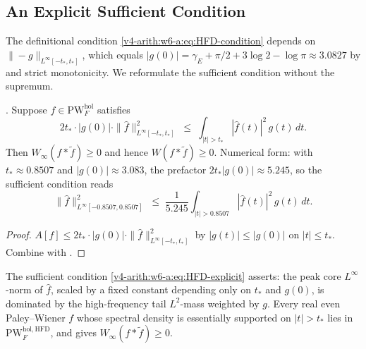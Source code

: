 \subsection{An Explicit Sufficient Condition}
\label{v4-arith:w6-a:HFD-subclass:explicit}

The definitional condition \eqref{v4-arith:w6-a:eq:HFD-condition}
depends on \(\|{-}g\|_{L^{\infty}[-t_{\ast},t_{\ast}]}\), which equals
\(|g(0)|=\gamma_{E}+\pi/2+3\log 2-\log\pi\approx 3.0827\) by
 and strict monotonicity. We
reformulate the sufficient condition without the supremum.

\begin{corollary}
\label{v4-arith:w6-a:cor:HFD-explicit}
\ClaimStatusProvedHere. Suppose \(f\in\mathrm{PW}^{\mathrm{hol}}_{F}\)
satisfies
\begin{equation}
\label{v4-arith:w6-a:eq:HFD-explicit}
2t_{\ast}\cdot|g(0)|\cdot\|\widehat{f}\|_{L^{\infty}[-t_{\ast},t_{\ast}]}^{2}
\;\leq\;
\int_{|t|>t_{\ast}}|\widehat{f}(t)|^{2}\,g(t)\,dt.
\end{equation}
Then \(W_{\infty}(f*\widetilde{f})\geq 0\) and hence
\(W(f*\widetilde{f})\geq 0\). Numerical form: with
\(t_{\ast}\approx 0.8507\) and \(|g(0)|\approx 3.083\), the prefactor
\(2t_{\ast}|g(0)|\approx 5.245\), so the sufficient condition reads
\begin{equation}
\label{v4-arith:w6-a:eq:HFD-explicit-numerical}
\|\widehat{f}\|_{L^{\infty}[-0.8507,0.8507]}^{2}\;\leq\;\frac{1}{5.245}\int_{|t|>0.8507}|\widehat{f}(t)|^{2}\,g(t)\,dt.
\end{equation}
\end{corollary}

\begin{proof}
\(A[f]\leq 2t_{\ast}\cdot|g(0)|\cdot\|\widehat{f}\|_{L^{\infty}[-t_{\ast},t_{\ast}]}^{2}\)
by \(|g(t)|\leq|g(0)|\) on \(|t|\leq t_{\ast}\). Combine with
.
\end{proof}

\begin{remark}[interpretation]
\label{v4-arith:w6-a:rem:HFD-interpretation}
The sufficient condition \eqref{v4-arith:w6-a:eq:HFD-explicit}
asserts: the peak core \(L^{\infty}\)-norm of \(\widehat{f}\), scaled by
a fixed constant depending only on \(t_{\ast}\) and \(g(0)\), is
dominated by the high-frequency tail \(L^{2}\)-mass weighted by \(g\).
Every real even Paley--Wiener \(f\) whose spectral density is
essentially supported on \(|t|>t_{\ast}\) lies in
\(\mathrm{PW}^{\mathrm{hol},\mathrm{HFD}}_{F}\), and
 gives \(W_{\infty}(f*\widetilde{f})\geq 0\).
\end{remark}

